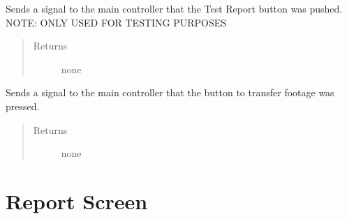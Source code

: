 \documentclass[letterpaper,10pt,english]{sphinxmanual}
\begin{document}
\begin{fulllineitems}
\begin{fulllineitems}
\label{\detokenize{index:src.Views.View_LoadingScreen.LoadingWindow.signalTestReport}}
Sends a signal to the main controller that the Test Report button was pushed.
NOTE: ONLY USED FOR TESTING PURPOSES
\begin{quote}\begin{description}
\item[{Returns}] \leavevmode
none

\end{description}\end{quote}

\end{fulllineitems}


\begin{fulllineitems}
\label{\detokenize{index:src.Views.View_LoadingScreen.LoadingWindow.signalTransferFootage}}
Sends a signal to the main controller that the button to transfer footage was pressed.
\begin{quote}\begin{description}
\item[{Returns}] \leavevmode
none

\end{description}\end{quote}

\end{fulllineitems}


\end{fulllineitems}



\chapter{Report Screen}
\label{\detokenize{index:module-src.Views.View_ReportScreen}}\label{\detokenize{index:report-screen}}
\end{document}
